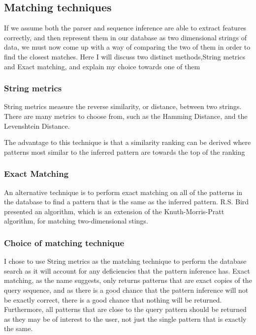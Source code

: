 \documentclass[12pt,twoside,notitlepage]{report}
\begin{document}
		\subsection{Matching techniques}

		If we assume both the parser and sequence inference are able to extract features correctly, and then represent them in our database as two dimensional strings of data, we must now come up with a way of comparing the two of them	in order to find the closest matches. Here I will discuss two distinct methods,String metrics and Exact matching, and explain my choice towards one of them 
			\subsubsection{String metrics}
			String metrics measure the reverse similarity, or distance, between two strings. There are many metrics to choose from, such as the Hamming Distance\cite{Hamming1950}, and the Levenshtein Distance\cite{Levenshtein1966}.
			
			The advantage to this technique is that a similarity ranking can be derived where patterns most similar to the inferred pattern are towards the top of the ranking
			\subsubsection{Exact Matching}
			An alternative technique is to perform exact matching on all of the patterns in the database to find a pattern that is the same as the inferred pattern. R.S. Bird presented an algorithm\cite{Bird1977}, which is an extension of the Knuth-Morris-Pratt algorithm\cite{KnuthMorrisPratt1974}, for matching two-dimensional stings.
			
			
			\subsubsection{Choice of matching technique}
			I chose to use String metrics as the matching technique to perform the database search as it will account for any deficiencies that the pattern inference has. Exact matching, as the name suggests, only returns patterns that are exact copies of the query sequence, and as there is a good chance that the pattern inference will not be exactly correct, there is a good chance that nothing will be returned. Furthermore, all patterns that are close to the query pattern should be returned as they may be of interest to the user, not just the single pattern that is exactly the same.
			
\end{document}
